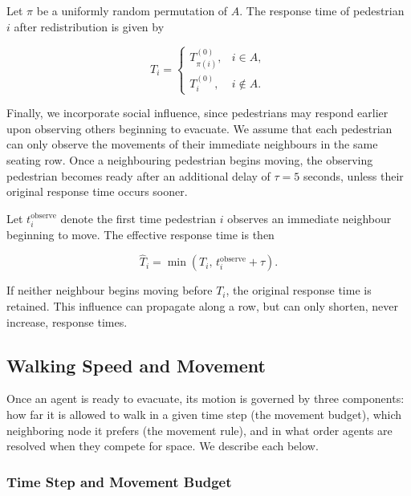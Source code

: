 \documentclass{article}
\begin{document}
Let $\pi$ be a uniformly random permutation of $A$.
The response time of pedestrian $i$ after redistribution
is given by

\begin{equation}
    T_i =
    \begin{cases}
        T_{\pi(i)}^{(0)}, & i \in A,\\
        T_i^{(0)}, & i \notin A.
    \end{cases}
    \label{eq:randomized_response}
\end{equation}

Finally, we incorporate social influence, since pedestrians
may respond earlier upon observing others beginning to
evacuate. We assume that each pedestrian can only observe
the movements of their immediate neighbours in the same
seating row. Once a neighbouring pedestrian begins moving,
the observing pedestrian becomes ready after an additional
delay of $\tau = 5$ seconds, unless their original response
time occurs sooner.

Let $t_i^{\mathrm{observe}}$ denote the first time pedestrian
$i$ observes an immediate neighbour beginning to move.
The effective response time is then

\begin{equation}
    \widehat{T}_i =
    \min\left(T_i,\,
    t_i^{\mathrm{observe}}+\tau\right).
    \label{eq:social_response}
\end{equation}

If neither neighbour begins moving before $T_i$, the
original response time is retained. This influence can
propagate along a row, but can only shorten,
never increase, response times.

\subsection{Walking Speed and Movement}
\label{sec:movement}

Once an agent is ready to evacuate, its motion is governed by three components: how far it is allowed to walk in a given time step (the movement budget), which neighboring node it prefers (the movement rule), and in what order agents are resolved when they compete for space. We describe each below.

\subsubsection{Time Step and Movement Budget}
\label{sec:budget}
\end{document}
